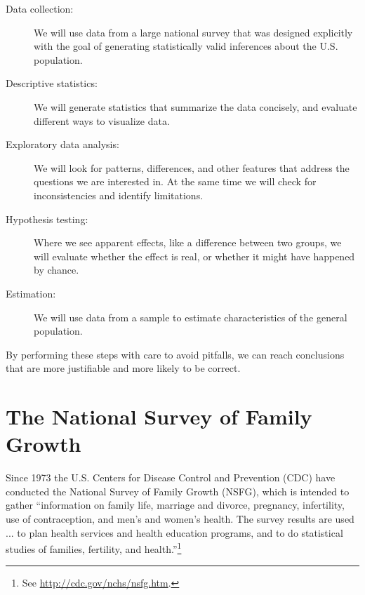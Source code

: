 \documentclass[12pt]{book}
\begin{document}
\begin{description}

\item[Data collection:] We will use data from a large national survey
  that was designed explicitly with the goal of generating
  statistically valid inferences about the U.S. population.

\item[Descriptive statistics:] We will generate statistics that
  summarize the data concisely, and evaluate different ways to
  visualize data.

\item[Exploratory data analysis:] We will look for
  patterns, differences, and other features that address the questions
  we are interested in.  At the same time we will check for
  inconsistencies and identify limitations.

\item[Hypothesis testing:] Where we see apparent effects, like a
  difference between two groups, we will evaluate whether the effect
  is real, or whether it might have happened by chance.

\item[Estimation:] We will use data from a sample to estimate
  characteristics of the general population.

\end{description}

By performing these steps with care to avoid pitfalls, we can
reach conclusions that are more justifiable and more likely to be
correct.


\section{The National Survey of Family Growth}
\label{nsfg}

Since 1973 the U.S. Centers for Disease Control and Prevention (CDC)
have conducted the National Survey of Family Growth (NSFG),
which is intended to gather ``information on family life, marriage and
divorce, pregnancy, infertility, use of contraception, and men's and
women's health. The survey results are used ... to plan health services and
health education programs, and to do statistical studies of families,
fertility, and health.''\footnote{See
  \url{http://cdc.gov/nchs/nsfg.htm}.}
\end{document}

